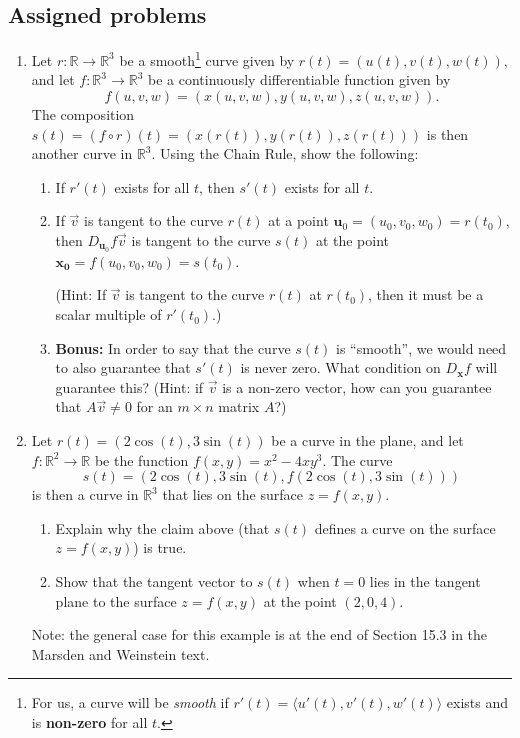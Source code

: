 \documentclass[letterpaper,12pt]{article}
\newcommand{\R}{\mathbb{R}}
\begin{document}
\subsection*{Assigned problems}
\begin{enumerate}
 \item Let $r:\R\to \R^3$ be a smooth\footnote{For us, a curve will be {\em smooth} if $r'(t)=\langle u'(t), v'(t), w'(t)\rangle$ exists and is {\bf non-zero} for all $t$.} curve given by $r(t)=(u(t),v(t),w(t))$, and let $f:\R^3\to\R^3$ be a continuously differentiable function given by
\[
 f(u,v,w) = (x(u,v,w), y(u,v,w), z(u,v,w)).
\]
 The composition $s(t) = (f\circ r) (t) = (x(r(t)), y(r(t)), z(r(t)))$ is then another curve in $\R^3$. Using the Chain Rule, show the following:
\begin{enumerate}
 \item If $r'(t)$ exists for all $t$, then $s'(t)$ exists for all $t$.
 
 \item If $\vec{v}$ is tangent to the curve $r(t)$ at a point $\mathbf{u}_0=(u_0,v_0,w_0) = r(t_0)$, then $D_{\mathbf{u}_0}f\vec{v}$ is tangent to the curve $s(t)$ at the point $\mathbf{x_0} = f(u_0,v_0,w_0) = s(t_0)$.

(Hint: If $\vec{v}$ is tangent to the curve $r(t)$ at $r(t_0)$, then it must be a scalar multiple of $r'(t_0)$.)

 \item {\bf Bonus:} In order to say that the curve $s(t)$ is ``smooth'', we would need to also guarantee that $s'(t)$ is never zero. What condition on $D_{\mathbf{x}}f$ will guarantee this? (Hint: if $\vec{v}$ is a non-zero vector, how can you guarantee that $A\vec{v}\neq 0$ for an $m\times n$ matrix $A$?)
\end{enumerate}

\item Let $r(t)=(2\cos(t), 3\sin(t))$ be a curve in the plane, and let $f:\R^2\to \R$ be the function $f(x,y) = x^2-4xy^3$. The curve
\[
 s(t) = (2\cos(t),3\sin(t), f(2\cos(t),3\sin(t)))
\]
is then a curve in $\R^3$ that lies on the surface $z=f(x,y)$.
\begin{enumerate}
 \item Explain why the claim above (that $s(t)$ defines a curve on the surface $z=f(x,y)$) is true.
 \item Show that the tangent vector to $s(t)$ when $t=0$ lies in the tangent plane to the surface $z=f(x,y)$ at the point $(2,0,4)$.
\end{enumerate}
Note: the general case for this example is at the end of Section 15.3 in the Marsden and Weinstein text.


\end{enumerate}
\end{document}
